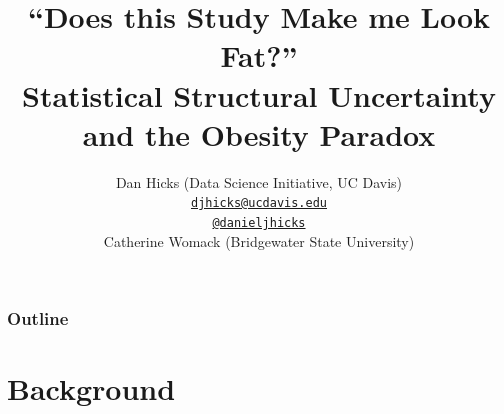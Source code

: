 \documentclass{philslides}
\newcommand{\talkurl}{\href{}{}}
\begin{document}
\date{}
\title{``Does this Study Make me Look Fat?''\\  Statistical Structural Uncertainty and the Obesity Paradox}
\author[Dan Hicks]{
	Dan Hicks (Data Science Initiative, UC Davis)\\
	{\scriptsize \href{mailto:djhicks@ucdavis.edu}{\texttt{djhicks@ucdavis.edu}}}\\ 
	{\scriptsize \href{https://twitter.com/danieljhicks}{\texttt{@danieljhicks}}}\\
	Catherine Womack (Bridgewater State University)
	}
	
\frame
{
	\titlepage
}

\frame
{
	\frametitle{Outline}
	\tableofcontents
}


\section{Background}
\subsection{}
\end{document}
